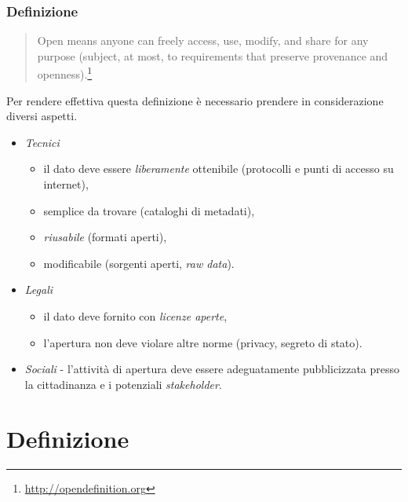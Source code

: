 \documentclass[8pt]{beamer}
\begin{document}
\begin{frame}
\frametitle{Definizione}

\begin{quote}
Open means anyone can freely access, use, modify, and share for any purpose (subject, at most, to requirements that preserve provenance and openness).\footnote{\url{http://opendefinition.org}} 
\end{quote}
\vspace{\baselineskip}

Per rendere effettiva questa definizione \`e necessario prendere in considerazione
diversi aspetti.
\vspace{\baselineskip}

\begin{itemize}[<+->]
 \item \emph{Tecnici} 
 \begin{itemize}
  \item il dato deve essere \emph{liberamente} ottenibile (protocolli e punti di accesso su internet),
  \item semplice da trovare (cataloghi di metadati),
  \item \emph{riusabile} (formati aperti),
  \item modificabile (sorgenti aperti, \emph{raw data}).
 \end{itemize}
 \item \emph{Legali} 
 \begin{itemize}
  \item il dato deve fornito con \emph{licenze aperte},
  \item l'apertura non deve violare altre norme (privacy, segreto di stato).
 \end{itemize}
 \item \emph{Sociali} - l'attivit\`a di apertura deve essere adeguatamente pubblicizzata
 presso la cittadinanza e i potenziali \emph{stakeholder}.
\end{itemize}
\end{frame}

\section{Definizione}
\end{document}
